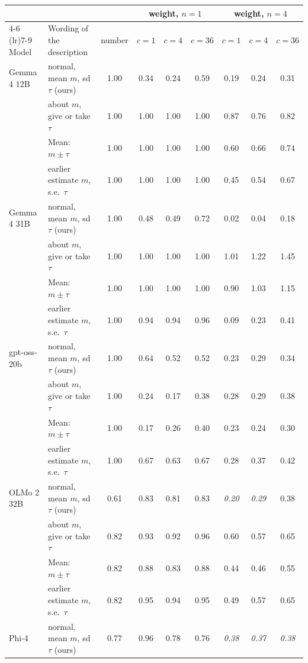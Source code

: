 \begin{tabular}{llccccccc}
\toprule
& & & \multicolumn{3}{c}{weight, $n = 1$} & \multicolumn{3}{c}{weight, $n = 4$} \\
\cmidrule(lr){4-6} \cmidrule(lr){7-9}
Model & Wording of the description & number & $c = 1$ & $c = 4$ & $c = 36$ & $c = 1$ & $c = 4$ & $c = 36$ \\
\midrule
Gemma 4 12B & normal, mean $m$, sd $\tau$ (ours) & 1.00 & 0.34 & 0.24 & 0.59 & 0.19 & 0.24 & 0.31 \\
 & about $m$, give or take $\tau$ & 1.00 & 1.00 & 1.00 & 1.00 & 0.87 & 0.76 & 0.82 \\
 & Mean: $m \pm \tau$ & 1.00 & 1.00 & 1.00 & 1.00 & 0.60 & 0.66 & 0.74 \\
 & earlier estimate $m$, s.e.\ $\tau$ & 1.00 & 1.00 & 1.00 & 1.00 & 0.45 & 0.54 & 0.67 \\
\midrule
Gemma 4 31B & normal, mean $m$, sd $\tau$ (ours) & 1.00 & 0.48 & 0.49 & 0.72 & 0.02 & 0.04 & 0.18 \\
 & about $m$, give or take $\tau$ & 1.00 & 1.00 & 1.00 & 1.00 & 1.01 & 1.22 & 1.45 \\
 & Mean: $m \pm \tau$ & 1.00 & 1.00 & 1.00 & 1.00 & 0.90 & 1.03 & 1.15 \\
 & earlier estimate $m$, s.e.\ $\tau$ & 1.00 & 0.94 & 0.94 & 0.96 & 0.09 & 0.23 & 0.41 \\
\midrule
gpt-oss-20b & normal, mean $m$, sd $\tau$ (ours) & 1.00 & 0.64 & 0.52 & 0.52 & 0.23 & 0.29 & 0.34 \\
 & about $m$, give or take $\tau$ & 1.00 & 0.24 & 0.17 & 0.38 & 0.28 & 0.29 & 0.38 \\
 & Mean: $m \pm \tau$ & 1.00 & 0.17 & 0.26 & 0.40 & 0.23 & 0.24 & 0.30 \\
 & earlier estimate $m$, s.e.\ $\tau$ & 1.00 & 0.67 & 0.63 & 0.67 & 0.28 & 0.37 & 0.42 \\
\midrule
OLMo 2 32B & normal, mean $m$, sd $\tau$ (ours) & 0.61 & 0.83 & 0.81 & 0.83 & \textit{0.20} & \textit{0.29} & 0.38 \\
 & about $m$, give or take $\tau$ & 0.82 & 0.93 & 0.92 & 0.96 & 0.60 & 0.57 & 0.65 \\
 & Mean: $m \pm \tau$ & 0.82 & 0.88 & 0.83 & 0.88 & 0.44 & 0.46 & 0.55 \\
 & earlier estimate $m$, s.e.\ $\tau$ & 0.82 & 0.95 & 0.94 & 0.95 & 0.49 & 0.57 & 0.65 \\
\midrule
Phi-4 & normal, mean $m$, sd $\tau$ (ours) & 0.77 & 0.96 & 0.78 & 0.76 & \textit{0.38} & \textit{0.37} & \textit{0.38} \\

\end{tabular}
